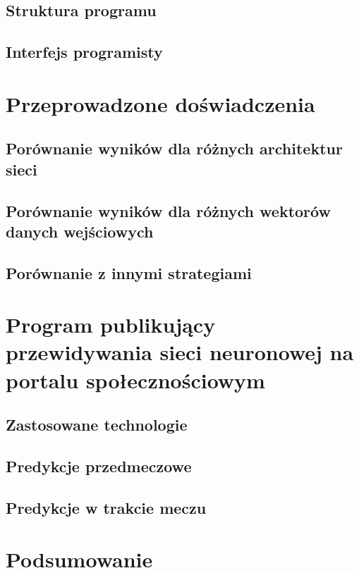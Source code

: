\section{Struktura programu}
\section{Interfejs programisty}

\chapter{Przeprowadzone doświadczenia}
\section{Porównanie wyników dla różnych architektur sieci}
\section{Porównanie wyników dla różnych wektorów danych wejściowych}
\section{Porównanie z innymi strategiami}

\chapter{Program publikujący przewidywania sieci neuronowej na portalu społecznościowym}
\section{Zastosowane technologie}
\section{Predykcje przedmeczowe}
\section{Predykcje w trakcie meczu}

\chapter{Podsumowanie}

